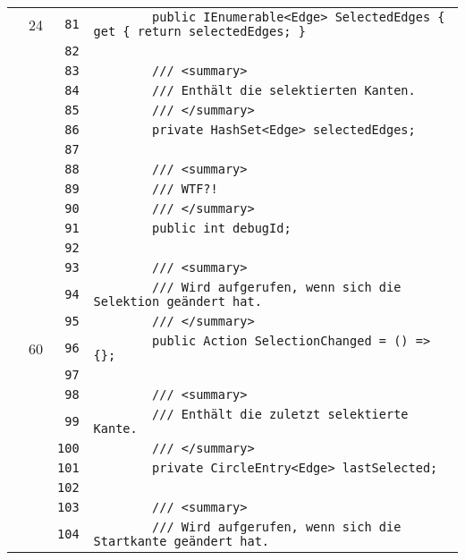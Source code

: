 \documentclass[a4paper,10pt]{article}
\begin{document}
\begin{longtable}[l]{lrrl}
\cellcolor{green} & 24 & \verb~81~ & \verb~        public IEnumerable<Edge> SelectedEdges { get { return selectedEdges; }~\\
\cellcolor{gray} &  & \verb~82~ & \verb~~\\
\cellcolor{gray} &  & \verb~83~ & \verb~        /// <summary>~\\
\cellcolor{gray} &  & \verb~84~ & \verb~        /// Enthält die selektierten Kanten.~\\
\cellcolor{gray} &  & \verb~85~ & \verb~        /// </summary>~\\
\cellcolor{gray} &  & \verb~86~ & \verb~        private HashSet<Edge> selectedEdges;~\\
\cellcolor{gray} &  & \verb~87~ & \verb~~\\
\cellcolor{gray} &  & \verb~88~ & \verb~        /// <summary>~\\
\cellcolor{gray} &  & \verb~89~ & \verb~        /// WTF?!~\\
\cellcolor{gray} &  & \verb~90~ & \verb~        /// </summary>~\\
\cellcolor{gray} &  & \verb~91~ & \verb~        public int debugId;~\\
\cellcolor{gray} &  & \verb~92~ & \verb~~\\
\cellcolor{gray} &  & \verb~93~ & \verb~        /// <summary>~\\
\cellcolor{gray} &  & \verb~94~ & \verb~        /// Wird aufgerufen, wenn sich die Selektion geändert hat.~\\
\cellcolor{gray} &  & \verb~95~ & \verb~        /// </summary>~\\
\cellcolor{green} & 60 & \verb~96~ & \verb~        public Action SelectionChanged = () => {};~\\
\cellcolor{gray} &  & \verb~97~ & \verb~~\\
\cellcolor{gray} &  & \verb~98~ & \verb~        /// <summary>~\\
\cellcolor{gray} &  & \verb~99~ & \verb~        /// Enthält die zuletzt selektierte Kante.~\\
\cellcolor{gray} &  & \verb~100~ & \verb~        /// </summary>~\\
\cellcolor{gray} &  & \verb~101~ & \verb~        private CircleEntry<Edge> lastSelected;~\\
\cellcolor{gray} &  & \verb~102~ & \verb~~\\
\cellcolor{gray} &  & \verb~103~ & \verb~        /// <summary>~\\
\cellcolor{gray} &  & \verb~104~ & \verb~        /// Wird aufgerufen, wenn sich die Startkante geändert hat.~\\

\end{longtable}
\end{document}
